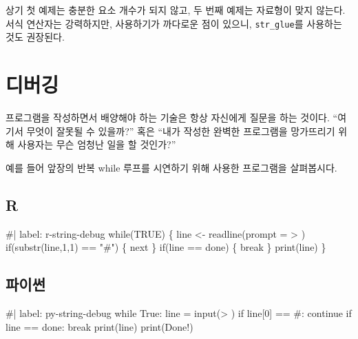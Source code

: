 \documentclass[
  letterpaper,
]{book}
\newenvironment{Shaded}{\begin{snugshade}}{\end{snugshade}}
\newcommand{\NormalTok}[1]{\textcolor[rgb]{0.00,0.23,0.31}{#1}}
\begin{document}
상기 첫 예제는 충분한 요소 개수가 되지 않고, 두 번째 예제는 자료형이
맞지 않는다. 서식 연산자는 강력하지만, 사용하기가 까다로운 점이 있으니,
\texttt{str\_glue}를 사용하는 것도 권장된다.

\section{디버깅}\label{r-string-debug}


프로그램을 작성하면서 배양해야 하는 기술은 항상 자신에게 질문을 하는
것이다. ``여기서 무엇이 잘못될 수 있을까?'' 혹은 ``내가 작성한 완벽한
프로그램을 망가뜨리기 위해 사용자는 무슨 엄청난 일을 할 것인가?''

예를 들어 앞장의 반복 while 루프를 시연하기 위해 사용한 프로그램을
살펴봅시다.

\subsection{R}

\begin{Shaded}
\begin{Highlighting}[]
\NormalTok{\#| label: r{-}string{-}debug}
\NormalTok{while(TRUE) \{}
\NormalTok{  line \textless{}{-} readline(prompt = \textquotesingle{}\textgreater{} \textquotesingle{})}
\NormalTok{  if(substr(line,1,1) == "\#") \{}
\NormalTok{    next}
\NormalTok{  \}}
\NormalTok{  if(line == \textquotesingle{}done\textquotesingle{}) \{}
\NormalTok{    break}
\NormalTok{  \}}
\NormalTok{  print(line)}
\NormalTok{\}}
\end{Highlighting}
\end{Shaded}

\subsection{파이썬}

\begin{Shaded}
\begin{Highlighting}[]
\NormalTok{\#| label: py{-}string{-}debug}
\NormalTok{while True:}
\NormalTok{    line = input(\textquotesingle{}\textgreater{} \textquotesingle{})}
\NormalTok{    if line[0] == \textquotesingle{}\#\textquotesingle{}:}
\NormalTok{        continue}
\NormalTok{    if line == \textquotesingle{}done\textquotesingle{}:}
\NormalTok{        break}
\NormalTok{    print(line)}
\NormalTok{print(\textquotesingle{}Done!\textquotesingle{})}
\end{Highlighting}
\end{Shaded}
\end{document}
